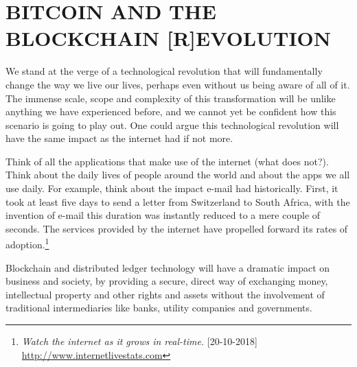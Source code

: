 \chapter{BITCOIN AND THE BLOCKCHAIN [R]EVOLUTION}
\label{ch:Bitcoin}

We stand at the verge of a technological revolution that will fundamentally change the way we live our lives, perhaps even without us being aware of all of it. The immense scale, scope and complexity of this transformation will be unlike anything we have experienced before, and we cannot yet be confident how this scenario is going to play out. One could argue this technological revolution will have the same impact as the internet had if not more.\medskip


\begin{tcolorbox}
[enhanced,
title=Internet is everywhere,
frame style=
{left color=orange!85!black,right color=yellow!95!black}]

Think of all the applications that make use of the internet (what does not?). Think about the daily lives of people around the world and about the apps we all use daily. For example, think about the impact e-mail had historically. First, it took at least five days to send a letter from Switzerland to South Africa, with the invention of e-mail this duration was instantly reduced to a mere couple of seconds. The services provided by the internet have propelled forward its rates of adoption.\footnote{\emph{Watch the internet as it grows in real-time.} [20-10-2018] \url{http://www.internetlivestats.com}}

\end{tcolorbox}
\medskip


Blockchain and distributed ledger technology will have a dramatic impact on business and society, by providing a secure, direct way of exchanging money, intellectual property and other rights and assets without the involvement of traditional intermediaries like banks, utility companies and governments. 

 \medskip
    \begin{tcolorbox}
    [enhanced,
    title=Digitization 2.0: The Internet of Value,
    frame style=
    {left color=orange!85!black,right color=yellow!95!black}]
    
\textit{}
\end{tcolorbox}
\medskip

